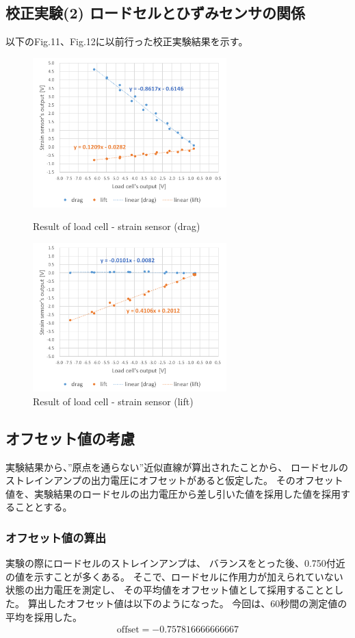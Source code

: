 \documentclass[twocolumn,a4j]{jsarticle}
\begin{document}
\subsection{校正実験(2) ロードセルとひずみセンサの関係}
以下のFig.11、Fig.12に以前行った校正実験結果を示す。
\begin{figure}[htbp]
    \footnotesize
    \begin{center}
        \includegraphics[width=75mm]{../images/calibration_2_drag.png}
        \caption{Result of load cell - strain sensor (drag)}
        \includegraphics[width=75mm]{../images/calibration_2_lift.png}
        \caption{Result of load cell - strain sensor (lift)}
    \end{center}
\end{figure}

\newpage
\subsection{オフセット値の考慮}
実験結果から、”原点を通らない”近似直線が算出されたことから、
ロードセルのストレインアンプの出力電圧にオフセットがあると仮定した。
そのオフセット値を、実験結果のロードセルの出力電圧から差し引いた値を採用した値を採用することとする。\\
\subsubsection{オフセット値の算出}
実験の際にロードセルのストレインアンプは、
バランスをとった後、0.750付近の値を示すことが多くある。
そこで、ロードセルに作用力が加えられていない状態の出力電圧を測定し、
その平均値をオフセット値として採用することとした。
算出したオフセット値は以下のようになった。
今回は、60秒間の測定値の平均を採用した。
\begin{eqnarray*}
  \mathrm{offset} = -0.757816666666667
\end{eqnarray*}
\end{document}
